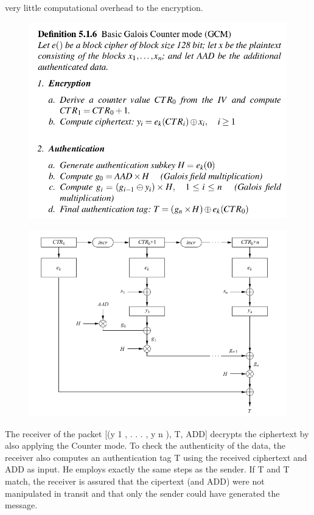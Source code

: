 \documentclass{article}
\begin{document}
very little computational overhead to the encryption.
\begin{figure}[H]
    \centering
    \includegraphics[scale=0.35]{2.png}
\end{figure}
\begin{figure}[H]
    \centering
    \includegraphics[scale=0.35]{3.png}
\end{figure}
The receiver of the packet [(y 1 , . . . , y n ), T, ADD] decrypts the ciphertext by also
applying the Counter mode. To check the authenticity of the data, the receiver also
computes an authentication tag T using the received ciphertext and ADD as input.
He employs exactly the same steps as the sender. If T and T match, the receiver is
assured that the cipertext (and ADD) were not manipulated in transit and that only
the sender could have generated the message.
\end{document}
